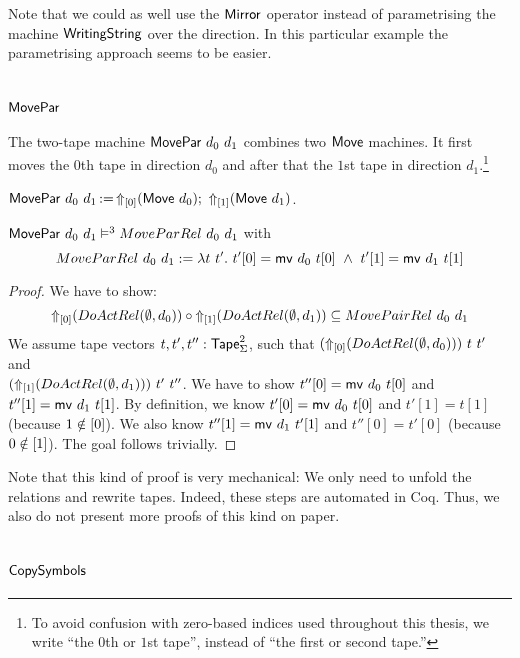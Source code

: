 Note that we could as well use the $\MS{Mirror}$ operator instead of parametrising the machine $\MS{WritingString}$ over the direction.  In this
particular example the parametrising approach seems to be easier.

\section{$\MS{MovePar}$}
\label{sec:MovePar}
%

The two-tape machine $\MS{MovePar}~d_0~d_1$ combines two $\MS{Move}$ machines.  It first moves the $0$th tape in direction $d_0$ and after that the
$1$st tape in direction $d_1$.\footnote{To avoid confusion with zero-based indices used throughout this thesis, we write ``the $0$th or $1$st tape'',
  instead of ``the first or second tape.''}
\begin{definition}[$\MS{MovePar}$][MovePar]
  \label{def:MovePar}
  $\MS{MovePar}~d_0~d_1 \defop \LiftTapes{(\MS{Move}~d_0)}{\Vector{0}} \Seq \LiftTapes{(\MS{Move}~d_1)}{\Vector{1}}$.
\end{definition}
\begin{lemma}
  \label{lem:MovePar_Sem}
  $\MS{MovePar}~d_0~d_1 \RealiseIn3 MoveParRel~d_0~d_1$ with
  \[
    MoveParRel~d_0~d_1 := \lambda t~t'.~t'[0]=\MS{mv}~d_0~t[0] ~\land~ t'[1]=\MS{mv}~d_1~t[1]
  \]
\end{lemma}
\begin{proof}
  We have to show:
  \[
    \LiftTapes{(DoActRel(\None,d_0))}{\Vector{0}} \circ
    \LiftTapes{(DoActRel(\None,d_1))}{\Vector{1}} \subseteq
    MovePairRel~d_0~d_1
  \]
  We assume tape vectors $t, t', t'' : \Tape_\Sigma^2$, such that $(\LiftTapes{(DoActRel(\None,d_0))}{\Vector{0}})~t~t'$ and \\
  $(\LiftTapes{(DoActRel(\None,d_1))}{\Vector{1}})~t'~t''$.  We have to show $t''[0]=\MS{mv}~d_0~t[0]$ and $t''[1]=\MS{mv}~d_1~t[1]$.  By definition,
  we know $t'[0]=\MS{mv}~d_0~t[0]$ and $t'[1]=t[1]$ (because $1 \notin \Vector{0}$).  We also know $t''[1]=\MS{mv}~d_1~t'[1]$ and $t''[0]=t'[0]$
  (because $0 \notin \Vector{1}$).  The goal follows trivially.
\end{proof}
Note that this kind of proof is very mechanical: We only need to unfold the relations and rewrite tapes.  Indeed, these steps are automated in Coq.
Thus, we also do not present more proofs of this kind on paper.

\section{$\MS{CopySymbols}$}
\label{sec:CopySymbols}
%

